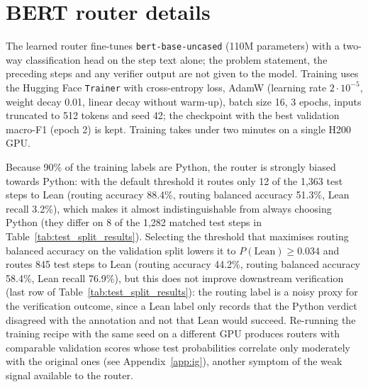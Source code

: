 \section{BERT router details}
\label{app:bert_details}
The learned router fine-tunes \texttt{bert-base-uncased} (110M parameters) \cite{devlin-etal-2019-bert} with a two-way classification head on the step text alone; the problem statement, the preceding steps and any verifier output are not given to the model. Training uses the Hugging Face \texttt{Trainer} with cross-entropy loss, AdamW (learning rate $2\cdot10^{-5}$, weight decay 0.01, linear decay without warm-up), batch size 16, 3 epochs, inputs truncated to 512 tokens and seed 42; the checkpoint with the best validation macro-F1 (epoch 2) is kept. Training takes under two minutes on a single H200 GPU.

Because 90\% of the training labels are Python, the router is strongly biased towards Python: with the default threshold it routes only 12 of the 1,363 test steps to Lean (routing accuracy 88.4\%, routing balanced accuracy 51.3\%, Lean recall 3.2\%), which makes it almost indistinguishable from always choosing Python (they differ on 8 of the 1,282 matched test steps in Table~\ref{tab:test_split_results}). Selecting the threshold that maximises routing balanced accuracy on the validation split lowers it to $P(\mathrm{Lean})\geq0.034$ and routes 845 test steps to Lean (routing accuracy 44.2\%, routing balanced accuracy 58.4\%, Lean recall 76.9\%), but this does not improve downstream verification (last row of Table~\ref{tab:test_split_results}): the routing label is a noisy proxy for the verification outcome, since a Lean label only records that the Python verdict disagreed with the annotation and not that Lean would succeed. Re-running the training recipe with the same seed on a different GPU produces routers with comparable validation scores whose test probabilities correlate only moderately with the original ones (see Appendix~\ref{app:ig}), another symptom of the weak signal available to the router.

